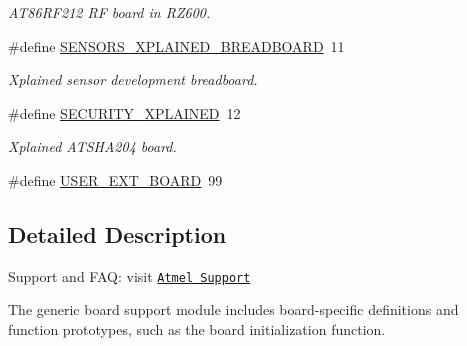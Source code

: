 \begin{DoxyCompactItemize}
\begin{DoxyCompactList}\small\item\em A\-T86\-R\-F212 R\-F board in R\-Z600. \end{DoxyCompactList}\item 
\hypertarget{group__group__common__boards_ga80102032338e3add4f64cbc40efc4376}{\#define \hyperlink{group__group__common__boards_ga80102032338e3add4f64cbc40efc4376}{S\-E\-N\-S\-O\-R\-S\-\_\-\-X\-P\-L\-A\-I\-N\-E\-D\-\_\-\-B\-R\-E\-A\-D\-B\-O\-A\-R\-D}~11}\label{group__group__common__boards_ga80102032338e3add4f64cbc40efc4376}

\begin{DoxyCompactList}\small\item\em Xplained sensor development breadboard. \end{DoxyCompactList}\item 
\hypertarget{group__group__common__boards_ga00921a34b346ce468cedc9a09b58a881}{\#define \hyperlink{group__group__common__boards_ga00921a34b346ce468cedc9a09b58a881}{S\-E\-C\-U\-R\-I\-T\-Y\-\_\-\-X\-P\-L\-A\-I\-N\-E\-D}~12}\label{group__group__common__boards_ga00921a34b346ce468cedc9a09b58a881}

\begin{DoxyCompactList}\small\item\em Xplained A\-T\-S\-H\-A204 board. \end{DoxyCompactList}\item 
\#define \hyperlink{group__group__common__boards_gaf75bc91f67cb2a761894691a9175a639}{U\-S\-E\-R\-\_\-\-E\-X\-T\-\_\-\-B\-O\-A\-R\-D}~99
\end{DoxyCompactItemize}


\subsection{Detailed Description}
Support and F\-A\-Q\-: visit \href{http://www.atmel.com/design-support/}{\tt Atmel Support}

The generic board support module includes board-\/specific definitions and function prototypes, such as the board initialization function. 

